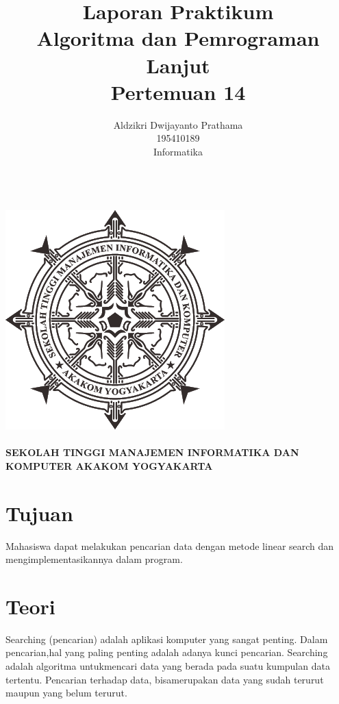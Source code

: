 \documentclass[a4paper,12pt]{article}
\begin{document}
\title{ {\Large Laporan Praktikum}\\ Algoritma dan Pemrograman Lanjut\\{\Large Pertemuan 14}}

\author{Aldzikri Dwijayanto Prathama
    \\195410189
    \\Informatika}
\makeatletter
\begin{titlepage}
    \begin{center}
        {\huge \bfseries \@title}\\[14ex]
        \includegraphics[scale=.8]{logo}\\[4ex]
        {\large \@author}\\[12ex]
        {\large \bfseries {SEKOLAH TINGGI MANAJEMEN INFORMATIKA DAN KOMPUTER
            AKAKOM YOGYAKARTA}}
    \end{center}


\end{titlepage}
\makeatother
\newpage
\tableofcontents
\newpage

\section{Tujuan}
Mahasiswa dapat melakukan pencarian data dengan metode linear search dan
mengimplementasikannya dalam program.
\section{Teori}
Searching (pencarian) adalah aplikasi komputer yang sangat penting. Dalam pencarian,hal yang paling penting adalah
adanya kunci pencarian. Searching adalah algoritma untukmencari data yang berada pada suatu kumpulan data tertentu.
Pencarian terhadap data, bisamerupakan data yang sudah terurut maupun yang belum terurut.
\end{document}
